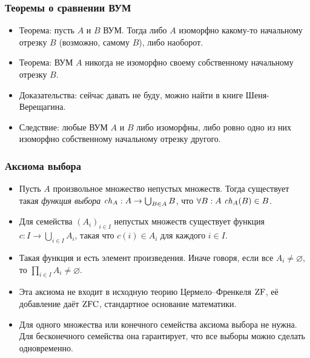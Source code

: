 \documentclass[10pt]{beamer}
\begin{document}
\begin{frame}
    \frametitle{Теоремы о сравнении ВУМ}
    \begin{itemize}
        \item Теорема: пусть $A$ и $B$ ВУМ. Тогда либо $A$ изоморфно какому-то начальному отрезку $B$ (возможно, самому $B$), либо наоборот.
        \item Теорема: ВУМ $A$ никогда не изоморфно своему собственному начальному отрезку $B$.
        \item Доказательства: сейчас давать не буду, можно найти в книге Шеня-Верещагина.
        \item Следствие: любые ВУМ $A$ и $B$ либо изоморфны, либо ровно одно из них изоморфно собственному начальному отрезку другого.
    \end{itemize}
\end{frame}

\begin{frame}
    \frametitle{Аксиома выбора}
    \begin{itemize}
        \item Пусть $A$ произвольное множество непустых множеств. Тогда существует такая \emph{функция выбора} $\mathit{ch}_A: A \to \bigcup_{B\in A}B$, что $\forall B:A~\mathit{ch}_A(B) \in B$.
        \item Для семейства $(A_i)_{i\in I}$ непустых множеств существует функция $c:I\to\bigcup_{i\in I}A_i$, такая что $c(i)\in A_i$ для каждого $i\in I$.
        \pause
        \item Такая функция и есть элемент произведения. Иначе говоря, если все $A_i\ne\varnothing$, то $\prod_{i\in I}A_i\ne\varnothing$.
        \item Эта аксиома не входит в исходную теорию Цермело--Френкеля $\mathrm{ZF}$, её добавление даёт $\mathrm{ZFC}$, стандартное основание математики.
        \item Для одного множества или конечного семейства аксиома выбора не нужна. Для бесконечного семейства она гарантирует, что все выборы можно сделать одновременно.
    \end{itemize}
\end{frame}
\end{document}
